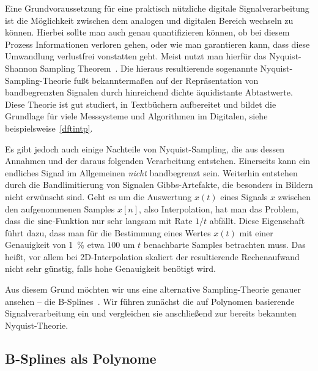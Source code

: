 %
Eine Grundvoraussetzung f\"ur eine praktisch n\"utzliche digitale Signalverarbeitung ist die M\"oglichkeit zwischen dem analogen und digitalen Bereich wechseln zu k\"onnen. Hierbei sollte man auch genau quantifizieren k\"onnen, ob bei diesem Prozess Informationen verloren gehen, oder wie man garantieren kann, dass diese Umwandlung verlustfrei vonstatten geht. Meist nutzt man hierf\"ur das Nyquist-Shannon Sampling Theorem~\cite[Kapitel~1.4.2]{proakis2013}. Die hieraus resultierende sogenannte Nyquist-Sampling-Theorie fu{\ss}t bekannterma{\ss}en auf der Repr\"asentation von bandbegrenzten Signalen durch hinreichend dichte \"aquidistante Abtastwerte. Diese Theorie ist gut studiert, in Textb\"uchern aufbereitet und bildet die Grundlage f\"ur viele Messsysteme und Algorithmen im Digitalen, siehe beispielsweise~\cref{dftintp}.

Es gibt jedoch auch einige Nachteile von Nyquist-Sampling, die aus dessen Annahmen und der daraus folgenden Verarbeitung entstehen. Einerseits kann ein endliches Signal im Allgemeinen \emph{nicht} bandbegrenzt sein. Weiterhin entstehen durch die Bandlimitierung von Signalen Gibbs-Artefakte, die besonders in Bildern nicht erw\"unscht sind. Geht es um die Auswertung $x(t)$ eines Signals $x$ zwischen den aufgenommenen Samples $x[n]$, also Interpolation, hat man das Problem, dass die $\operatorname*{sinc}$-Funktion nur sehr langsam mit Rate $1/t$ abf\"allt. Diese Eigenschaft f\"uhrt dazu, dass man f\"ur die Bestimmung eines Wertes $x(t)$ mit einer Genauigkeit von \SI{1}{\percent} etwa $100$ um $t$ benachbarte Samples betrachten muss. Das hei{\ss}t, vor allem bei 2D-Interpolation skaliert der resultierende Rechenaufwand nicht sehr g\"unstig, falls hohe Genauigkeit ben\"otigt wird.

Aus diesem Grund m\"ochten wir uns eine alternative Sampling-Theorie genauer ansehen -- die B-Splines~\cite{unser1999splines_mag}. Wir f\"uhren zun\"achst die auf Polynomen basierende Signalverarbeitung ein und vergleichen sie anschlie{\ss}end zur bereits bekannten Nyquist-Theorie.

\subsection{B-Splines als Polynome}

